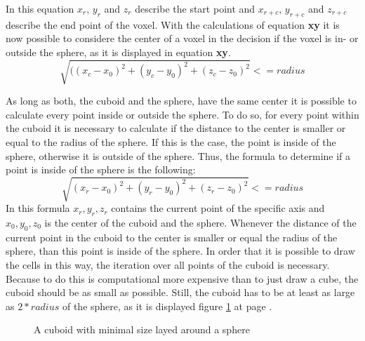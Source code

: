 In this equation $x_{r}$, $y_{r}$ and $z_{r}$ describe the start point and $x_{r+c}$, $y_{r+c}$ and $z_{r+c}$ describe the end point of the voxel.
With the calculations of equation \textbf{xy} it is now possible to considere the center of a voxel in the decision if the voxel is in- or outside the sphere, as it is displayed in equation \textbf{xy}.
\begin{equation}
\sqrt{((x_{c} - x_{0})^{2} + (y_{c} - y_{0})^{2} + (z_{c} -z_{0})^{2}} <= radius
\end{equation}


As long as both, the cuboid and the sphere, have the same center it is possible to calculate every point inside or outside the sphere\cite{REF}. To do so, for every point within the cuboid it is necessary to calculate if the distance to the center is smaller or equal to the radius of the sphere. If this is the case, the point is inside of the sphere, otherwise it is outside of the sphere. Thus, the formula to determine if a point is inside of the sphere is the following:
\begin{equation}
\sqrt{(x_{r}-x_{0})^2 + (y_{r}-y_{0})^2 + (z_{r}-z_{0})^2} <= radius
\end{equation}
In this formula $x_{r},y_{r},z_{r}$ contains the current point of the specific axis and $x_{0},y_{0},z_{0}$ is the center of the cuboid and the sphere. Whenever the distance of the current point in the cuboid to the center is smaller or equal the radius of the sphere, than this point is inside of the sphere. \newline
In order that it is possible to draw the cells in this way, the iteration over all points of the cuboid is necessary. Because to do this is computational more expensive than to just draw a cube, the cuboid should be as small as possible. Still, the cuboid has to be at least as large as $2*radius$ of the sphere, as it is displayed figure \ref{tikz:CuboidSphere} at page \pageref{tikz:CuboidSphere}.

\begin{figure}
\begin{center}
\caption{A cuboid with minimal size layed around a sphere}
\label{tikz:CuboidSphere}
\end{center}
\end{figure}


